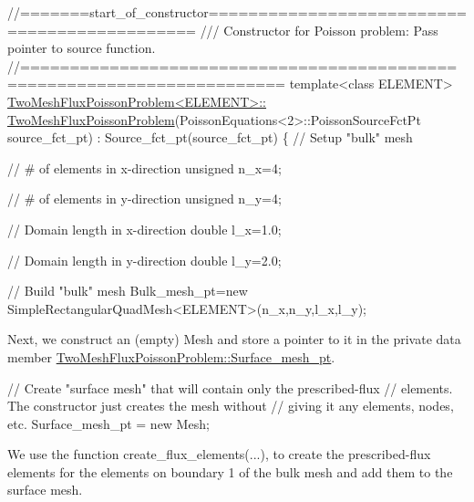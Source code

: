 \begin{DoxyCodeInclude}
\textcolor{comment}{//=======start\_of\_constructor=============================================}
\textcolor{comment}{/// Constructor for Poisson problem: Pass pointer to source function.}
\textcolor{comment}{}\textcolor{comment}{//========================================================================}
\textcolor{keyword}{template}<\textcolor{keyword}{class} ELEMENT>
\hyperlink{classTwoMeshFluxPoissonProblem_ace5a47aa61da5fd2a8761a16ffb3711c}{TwoMeshFluxPoissonProblem<ELEMENT>::}
\hyperlink{classTwoMeshFluxPoissonProblem_ace5a47aa61da5fd2a8761a16ffb3711c}{TwoMeshFluxPoissonProblem}(PoissonEquations<2>::PoissonSourceFctPt source\_fct\_pt)
 :  Source\_fct\_pt(source\_fct\_pt)
\{ 
 \textcolor{comment}{// Setup "bulk" mesh}

 \textcolor{comment}{// # of elements in x-direction}
 \textcolor{keywordtype}{unsigned} n\_x=4;

 \textcolor{comment}{// # of elements in y-direction}
 \textcolor{keywordtype}{unsigned} n\_y=4;

 \textcolor{comment}{// Domain length in x-direction}
 \textcolor{keywordtype}{double} l\_x=1.0;

 \textcolor{comment}{// Domain length in y-direction}
 \textcolor{keywordtype}{double} l\_y=2.0;

 \textcolor{comment}{// Build "bulk" mesh}
 Bulk\_mesh\_pt=\textcolor{keyword}{new} SimpleRectangularQuadMesh<ELEMENT>(n\_x,n\_y,l\_x,l\_y);

\end{DoxyCodeInclude}


Next, we construct an (empty) {\ttfamily Mesh} and store a pointer to it in the private data member {\ttfamily \hyperlink{classTwoMeshFluxPoissonProblem_a96b1ff6102eceb5ce432ac9197f68283}{Two\+Mesh\+Flux\+Poisson\+Problem\+::\+Surface\+\_\+mesh\+\_\+pt}}.


\begin{DoxyCodeInclude}
 \textcolor{comment}{// Create "surface mesh" that will contain only the prescribed-flux }
 \textcolor{comment}{// elements. The constructor just creates the mesh without}
 \textcolor{comment}{// giving it any elements, nodes, etc.}
 Surface\_mesh\_pt = \textcolor{keyword}{new} Mesh;

\end{DoxyCodeInclude}


We use the function {\ttfamily create\+\_\+flux\+\_\+elements}(...), to create the prescribed-\/flux elements for the elements on boundary 1 of the bulk mesh and add them to the surface mesh.


